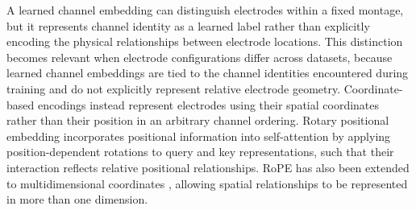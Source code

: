 A learned channel embedding can distinguish electrodes within a fixed montage, but it represents channel identity as a learned label rather than explicitly encoding the physical relationships between electrode locations. This distinction becomes relevant when electrode configurations differ across datasets, because learned channel embeddings are tied to the channel identities encountered during training and do not explicitly represent relative electrode geometry. Coordinate-based encodings instead represent electrodes using their spatial coordinates rather than their position in an arbitrary channel ordering. Rotary positional embedding \parencite[RoPE;][]{suRoFormerEnhancedTransformer2024} incorporates positional information into self-attention by applying position-dependent rotations to query and key representations, such that their interaction reflects relative positional relationships. RoPE has also been extended to multidimensional coordinates \parencite{heoRotaryPositionEmbedding2025}, allowing spatial relationships to be represented in more than one dimension.
